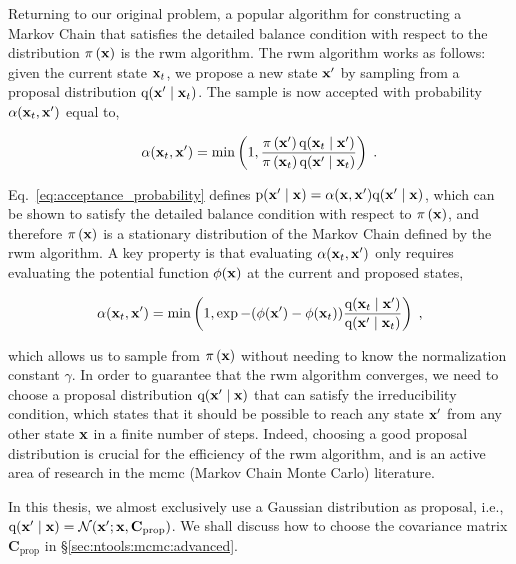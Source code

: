 \smallskip
Returning to our original problem, a popular algorithm for constructing a Markov Chain that satisfies the detailed balance condition with respect to the distribution $\pi \left( \mathbf{x}\right)$ is the \gls{rwm} algorithm. The \gls{rwm} algorithm works as follows: given the current state $\mathbf{x}_t$, we propose a new state $\mathbf{x}'$ by sampling from a proposal distribution $\mathrm{q}(\mathbf{x}' \mid \mathbf{x}_t)$. The sample is now accepted with probability $\alpha(\mathbf{x}_t, \mathbf{x}')$ equal to,

\begin{equation}
  \alpha(\mathbf{x}_t, \mathbf{x}') = \min\left(1, \frac{\pi \left( \mathbf{x}'\right) \mathrm{q}(\mathbf{x}_t \mid \mathbf{x}')}{\pi \left( \mathbf{x}_t\right) \mathrm{q}(\mathbf{x}' \mid \mathbf{x}_t)}\right)\;.
  \label{eq:acceptance_probability}
\end{equation}

Eq.~\eqref{eq:acceptance_probability} defines $\mathrm{p}(\mathbf{x}' \mid \mathbf{x}) = \alpha(\mathbf{x}, \mathbf{x}') \mathrm{q}(\mathbf{x}' \mid \mathbf{x})$, which can be shown to satisfy the detailed balance condition with respect to $\pi \left( \mathbf{x}\right)$, and therefore $\pi \left( \mathbf{x}\right)$ is a stationary distribution of the Markov Chain defined by the \gls{rwm} algorithm. A key property is that evaluating $\alpha(\mathbf{x}_t, \mathbf{x}')$ only requires evaluating the potential function $\phi(\mathbf{x})$ at the current and proposed states, 

\begin{equation}
  \alpha(\mathbf{x}_t, \mathbf{x}') = \min\left(1, \exp{-(\phi(\mathbf{x}') - \phi(\mathbf{x}_t))} \frac{\mathrm{q}(\mathbf{x}_t \mid \mathbf{x}')}{\mathrm{q}(\mathbf{x}' \mid \mathbf{x}_t)}\right)\;,
\end{equation}

which allows us to sample from $\pi \left( \mathbf{x}\right)$ without needing to know the normalization constant $\gamma$. 
In order to guarantee that the \gls{rwm} algorithm converges, we need to choose a proposal distribution $\mathrm{q}(\mathbf{x}' \mid \mathbf{x})$ that can satisfy the irreducibility condition, which states that it should be possible to reach any state $\mathbf{x}'$ from any other state $\mathbf{x}$ in a finite number of steps. Indeed, choosing a good proposal distribution is crucial for the efficiency of the \gls{rwm} algorithm, and is an active area of research in the \gls{mcmc} (Markov Chain Monte Carlo) literature. 

\smallskip
In this thesis, we almost exclusively use a Gaussian distribution as proposal, i.e., $\mathrm{q}(\mathbf{x}' \mid \mathbf{x}) = \mathcal{N}(\mathbf{x}'; \mathbf{x}, \mathbf{C}_{\mathrm{prop}})$. We shall discuss how to choose the covariance matrix $\mathbf{C}_{\mathrm{prop}}$ in \S\ref{sec:ntools:mcmc:advanced}.



